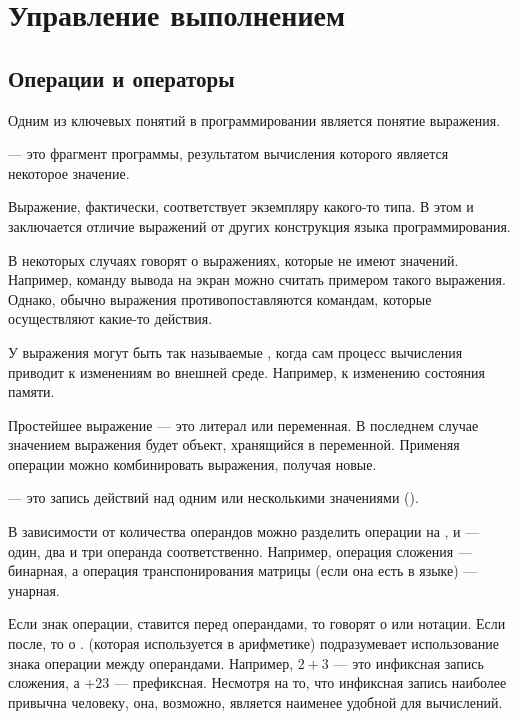 \chapter{Управление выполнением}

\section{Операции и операторы}


Одним из ключевых понятий в программировании является понятие выражения.

\begin{defn}
   — это фрагмент программы, результатом
  вычисления которого является некоторое значение.
\end{defn}

Выражение, фактически, соответствует экземпляру какого-то типа. В этом
и заключается отличие выражений от других конструкция языка
программирования.

В некоторых случаях говорят о выражениях, которые не имеют
значений. Например, команду вывода на экран можно считать примером
такого выражения. Однако, обычно выражения противопоставляются
командам, которые осуществляют какие-то действия.

У выражения могут быть так называемые , когда сам процесс вычисления приводит к изменениям во
внешней среде. Например, к изменению состояния памяти.

Простейшее выражение — это литерал или переменная. В последнем случае
значением выражения будет объект, хранящийся в переменной. Применяя
операции можно комбинировать выражения, получая новые.

\begin{defn}
   — это запись действий над одним или
  несколькими значениями ().
\end{defn}


В зависимости от количества операндов можно разделить операции на
,  и
 — один, два и три операнда
соответственно. Например, операция сложения — бинарная, а операция
транспонирования матрицы (если она есть в языке) — унарная.

Если знак операции, ставится перед операндами, то говорят о
 или нотации. Если после,
то о
.  (которая используется в арифметике) подразумевает
использование знака операции между операндами. Например, $2 + 3$ — это
инфиксная запись сложения, а $+ 2 3$ — префиксная. Несмотря на то, что
инфиксная запись наиболее привычна человеку, она, возможно, является
наименее удобной для вычислений.

